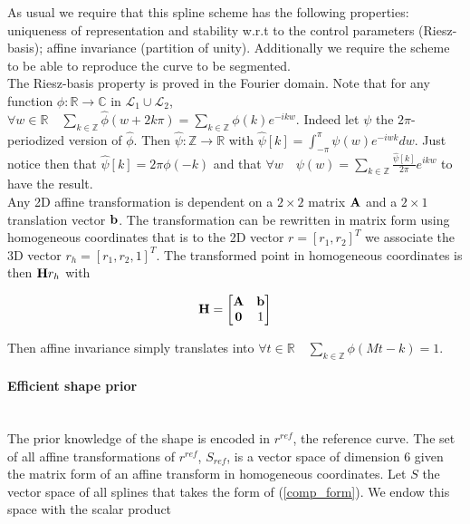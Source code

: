 \documentclass[a4paper, 11pt]{article}
\begin{document}
As usual we require that this spline scheme has the following properties: uniqueness of representation and stability 
w.r.t to the control parameters (Riesz-basis); affine invariance (partition of unity). Additionally we require the 
scheme to be able to reproduce the curve to be segmented. \\

The Riesz-basis property is proved in the Fourier domain. Note that for any function $\phi: \mathbb{R} \to \mathbb{C}$ 
in $\mathcal{L}_1 \cup \mathcal{L}_2$, $\displaystyle \forall w \in \mathbb{R} \quad \sum_{k \in \mathbb{Z}} 
\hat{\phi}(w + 2k\pi) = \sum_{k \in \mathbb{Z}} \phi(k) e^{-ikw}$. Indeed let $\psi$ the $2\pi$-periodized version of 
$\hat{\phi}$. Then $\hat{\psi}: \mathbb{Z} \to \mathbb{R}$ with $\hat{\psi}[k] = \int_{-\pi}^{\pi} \psi(w) e^{-iwk} dw$.  
Just notice then that $\hat{\psi}[k] = 2\pi \phi(-k)$ and that $\displaystyle \forall w \quad \psi(w) = \sum_{k \in 
\mathbb{Z}} \frac{\hat{\psi}[k]}{2\pi} e^{ikw}$ to have the result. \\

Any 2D affine transformation is dependent on a $2\times2$ matrix $\bf A$ and a $2\times1$ translation vector $\bf b$.  
The transformation can be rewritten in matrix form using homogeneous coordinates that is to the 2D vector $r = {[r_1, 
r_2]}^T$ we associate the 3D vector $r_h = {[r_1, r_2, 1]}^T$. The transformed point in homogeneous coordinates is then 
${\bf H}r_h$ with 

\begin{equation}
  {\bf H} = \begin{bmatrix} {\bf A} & {\bf b} \\ {\bf 0} & 1 \end{bmatrix}
\end{equation}

Then affine invariance simply translates into $\displaystyle \forall t \in \mathbb{R} \quad \sum_{k \in \mathbb{Z}} 
\phi(Mt-k) = 1$.

\paragraph{Efficient shape prior} \mbox{} \\

The prior knowledge of the shape is encoded in  $r^{ref}$, the reference curve. The set of all affine transformations of 
$r^{ref}$, $S_{ref}$, is a vector space of dimension 6 given the matrix form of an affine transform in homogeneous 
coordinates. Let $S$ the vector space of all splines that takes the form of (\ref{comp_form}). We endow this space with 
the scalar product
\end{document}
